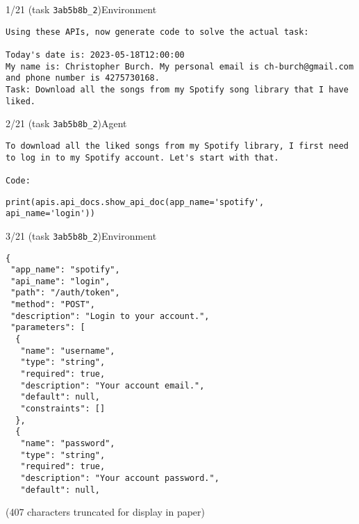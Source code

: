 

\hspace*{8mm}%
\begin{minipage}{0.95\linewidth}
\begin{user_message_box}{{1/21 (task \texttt{3ab5b8b\_2})\hfill Environment}}
\scriptsize
\begin{Verbatim}[breaklines]
Using these APIs, now generate code to solve the actual task:

Today's date is: 2023-05-18T12:00:00
My name is: Christopher Burch. My personal email is ch-burch@gmail.com and phone number is 4275730168.
Task: Download all the songs from my Spotify song library that I have liked.
\end{Verbatim}
\end{user_message_box}
\end{minipage}

\begin{minipage}{0.95\linewidth}
\begin{assistant_message_box}{{2/21 (task \texttt{3ab5b8b\_2})\hfill Agent}}
\scriptsize
\begin{Verbatim}[breaklines]
To download all the liked songs from my Spotify library, I first need to log in to my Spotify account. Let's start with that.

Code:
\end{Verbatim}
\begin{tcolorbox}[colback=codebgcolor,boxrule=0pt]\begin{Verbatim}[breaklines]
print(apis.api_docs.show_api_doc(app_name='spotify', api_name='login'))
\end{Verbatim}
\end{tcolorbox}\end{assistant_message_box}
\end{minipage}

\hspace*{8mm}%
\begin{minipage}{0.95\linewidth}
\begin{user_message_box}{{3/21 (task \texttt{3ab5b8b\_2})\hfill Environment}}
\scriptsize
\begin{Verbatim}[breaklines]
{
 "app_name": "spotify",
 "api_name": "login",
 "path": "/auth/token",
 "method": "POST",
 "description": "Login to your account.",
 "parameters": [
  {
   "name": "username",
   "type": "string",
   "required": true,
   "description": "Your account email.",
   "default": null,
   "constraints": []
  },
  {
   "name": "password",
   "type": "string",
   "required": true,
   "description": "Your account password.",
   "default": null,
\end{Verbatim}
(407 characters truncated for display in paper)\end{user_message_box}
\end{minipage}

